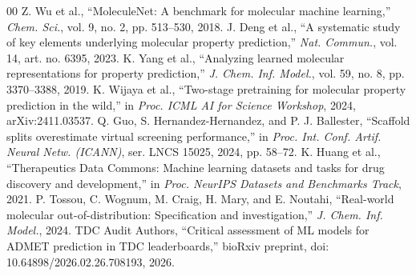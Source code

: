 \documentclass[conference]{IEEEtran}
\begin{document}
\begin{thebibliography}{00}
 Z. Wu et al., ``MoleculeNet: A benchmark for molecular machine learning,'' \textit{Chem. Sci.}, vol. 9, no. 2, pp. 513--530, 2018.
 J. Deng et al., ``A systematic study of key elements underlying molecular property prediction,'' \textit{Nat. Commun.}, vol. 14, art. no. 6395, 2023.
 K. Yang et al., ``Analyzing learned molecular representations for property prediction,'' \textit{J. Chem. Inf. Model.}, vol. 59, no. 8, pp. 3370--3388, 2019.
 K. Wijaya et al., ``Two-stage pretraining for molecular property prediction in the wild,'' in \textit{Proc. ICML AI for Science Workshop}, 2024, arXiv:2411.03537.
 Q. Guo, S. Hernandez-Hernandez, and P. J. Ballester, ``Scaffold splits overestimate virtual screening performance,'' in \textit{Proc. Int. Conf. Artif. Neural Netw. (ICANN)}, ser. LNCS 15025, 2024, pp. 58--72.
 K. Huang et al., ``Therapeutics Data Commons: Machine learning datasets and tasks for drug discovery and development,'' in \textit{Proc. NeurIPS Datasets and Benchmarks Track}, 2021.
 P. Tossou, C. Wognum, M. Craig, H. Mary, and E. Noutahi, ``Real-world molecular out-of-distribution: Specification and investigation,'' \textit{J. Chem. Inf. Model.}, 2024.
 TDC Audit Authors, ``Critical assessment of ML models for ADMET prediction in TDC leaderboards,'' bioRxiv preprint, doi: 10.64898/2026.02.26.708193, 2026.
\end{thebibliography}
\end{document}
